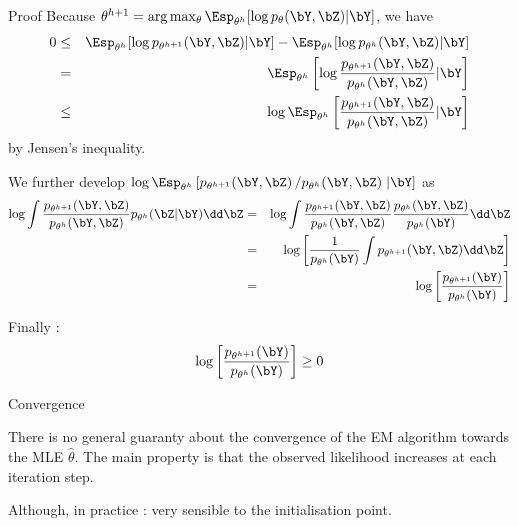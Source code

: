 \documentclass[compress,10pt]{beamer}
\begin{document}
\begin{frame}[allowframebreaks]{Proof}
Because $\theta^{h+1} = \arg\max_\theta \Esp_{\theta^h}[\log p_\theta(\bY, \bZ) |\bY]$, we have
\begin{eqnarray}
  0 & \leq & \Esp_{\theta^h}[\log p_{\theta^{h+1}}(\bY, \bZ) |\bY] - \Esp_{\theta^h}[\log p_{\theta^{h}}(\bY, \bZ) |\bY] \\
  & = & \Esp_{\theta^h} \left[\log \frac{p_{\theta^{h+1}}(\bY, \bZ)}{p_{\theta^{h}}(\bY, \bZ)} | \bY \right]\\
  &\leq& \quad \log \Esp_{\theta^h} \left[\frac{p_{\theta^{h+1}}(\bY, \bZ)}{p_{\theta^{h}}(\bY, \bZ)} | \bY \right]
\end{eqnarray}
by Jensen's inequality. 


We further develop $\log \Esp_{\theta^h} \left[p_{\theta^{h+1}}(\bY, \bZ) \left/ p_{\theta^{h}}(\bY, \bZ) \right. | \bY \right]$ as
\begin{eqnarray}
  \log \int \frac{p_{\theta^{h+1}}(\bY, \bZ)}{p_{\theta^{h}}(\bY, \bZ)} p_{\theta^h}(\bZ | \bY) \dd \bZ 
  & = & \log \int \frac{p_{\theta^{h+1}}(\bY, \bZ)}{p_{\theta^{h}}(\bY, \bZ)} \frac{p_{\theta^h}(\bY, \bZ)}{p_{\theta^h}(\bY)} \dd \bZ \\
  & = & \log \left[ \frac1{p_{\theta^h}(\bY)} \int p_{\theta^{h+1}}(\bY, \bZ) \dd \bZ \right]  \\
   &=& \quad \log \left[ \frac{p_{\theta^{h+1}}(\bY)}{p_{\theta^h}(\bY)} \right]
\end{eqnarray}

Finally : 
$$  \log \left[ \frac{p_{\theta^{h+1}}(\bY)}{p_{\theta^h}(\bY)} \right] \geq 0$$ 


\end{frame}


\begin{frame}{Convergence}

There is no general guaranty about the convergence of the EM algorithm towards the MLE $\widehat{\theta}$. The main property is that the observed likelihood increases at each iteration step.


Although, in practice : very sensible to the initialisation point. 
\end{frame}
\end{document}
